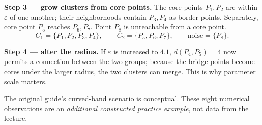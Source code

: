 \textbf{Step 3 --- grow clusters from core points.} The core points $P_1,P_2$ are within $\varepsilon$ of one another; their neighborhoods contain $P_3,P_4$ as border points. Separately, core point $P_5$ reaches $P_6,P_7$. Point $P_8$ is unreachable from a core point.
\[
\boxed{C_1=\{P_1,P_2,P_3,P_4\}},\qquad
\boxed{C_2=\{P_5,P_6,P_7\}},\qquad
\boxed{\text{noise}=\{P_8\}}.
\]
\begin{center}
\end{center}
\textbf{Step 4 --- alter the radius.} If $\varepsilon$ is increased to $4.1$, $d(P_4,P_5)=4$ now permits a connection between the two groups; because the bridge points become cores under the larger radius, the two clusters can merge. This is why parameter scale matters.
\begin{important}
The original guide's curved-band scenario is conceptual. These eight numerical observations are an \emph{additional constructed practice example}, not data from the lecture.
\end{important}
